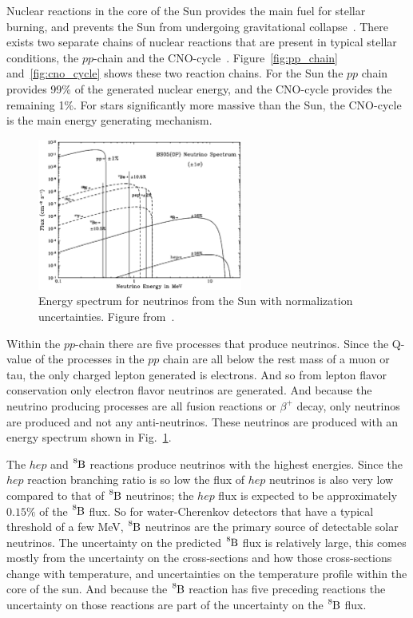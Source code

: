 Nuclear reactions in the core of the Sun provides the main fuel for
stellar burning, and prevents the Sun from undergoing gravitational
collapse~\citep{bethe1, bethe2}.
There exists two separate chains of nuclear reactions that are present in typical
stellar conditions, the $pp$-chain and the CNO-cycle~\citep{bahcall_solar_neutrinos_theory}.
Figure~\ref{fig:pp_chain} and~\ref{fig:cno_cycle} shows these two reaction chains.
For the Sun the $pp$ chain
provides 99\% of the generated nuclear energy, and the CNO-cycle provides the remaining
1\%. For stars significantly more massive than the Sun, the CNO-cycle is the
main energy generating mechanism.

\begin{figure}[htbp]
\centering
\includegraphics[width=0.6\textwidth]{bs05op_spectrum}
\caption[Solar Neutrino Spectrum]{Energy spectrum for neutrinos from
the Sun with normalization uncertainties. Figure from~\citep{bs_ssm}.}
\label{fig:bs05_spectrum}
\end{figure}

Within the $pp$-chain there are five processes that produce neutrinos.
Since the Q-value of the processes in the $pp$ chain are all below the rest mass
of a muon or tau, the only charged lepton generated is electrons. And so from
lepton flavor conservation only electron flavor neutrinos are generated.
And because the neutrino producing processes are all fusion reactions or
$\beta^{+}$ decay, only neutrinos are produced and not any anti-neutrinos.
These neutrinos are produced with an energy spectrum shown in Fig.~\ref{fig:bs05_spectrum}.

The $hep$ and $\ce{^{8}B}$ reactions produce neutrinos with the highest
energies. Since the $hep$ reaction branching ratio is so low the flux
of $hep$ neutrinos is also very low compared to that of $\ce{^{8}B}$ neutrinos;
the $hep$ flux is expected to be approximately $0.15\%$ of the $\ce{^{8}B}$ flux.
So for water-Cherenkov detectors that have a typical threshold of a few MeV,
$\ce{^{8}B}$ neutrinos are the primary source of detectable solar neutrinos.
The uncertainty on the predicted $\ce{^{8}B}$ flux is relatively large, this comes mostly
from the uncertainty on the cross-sections and how those cross-sections change with
temperature, and uncertainties on the temperature profile within the core of the sun.
And because the $\ce{^{8}B}$ reaction has five preceding reactions the uncertainty on
 those reactions are part of the uncertainty on the $\ce{^{8}B}$ flux.

